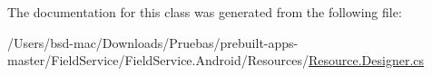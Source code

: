 The documentation for this class was generated from the following file\+:\begin{DoxyCompactItemize}
\item 
/\+Users/bsd-\/mac/\+Downloads/\+Pruebas/prebuilt-\/apps-\/master/\+Field\+Service/\+Field\+Service.\+Android/\+Resources/\hyperlink{_field_service_8_android_2_resources_2_resource_8designer_8cs}{Resource.\+Designer.\+cs}\end{DoxyCompactItemize}
